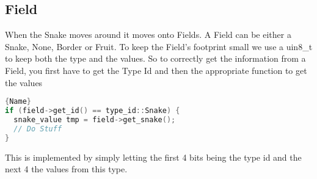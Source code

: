 \subsection{Field}

When the Snake moves around it moves onto Fields. A Field can be either a Snake, None, Border or Fruit. To keep the Field's footprint small we use a uin8\_t to keep both the type and the values. So to correctly get the information from a Field, you first have to get the Type Id and then the appropriate function to get the values

\begin{lstlisting}[caption={Getting Correct Data From a Field},label={lst:get_snake},frame=tlrb, language=C++]{Name}
if (field->get_id() == type_id::Snake) {
  snake_value tmp = field->get_snake();
  // Do Stuff
}
\end{lstlisting}

This is implemented by simply letting the first 4 bits being the type id and the next 4 the values from this type.
